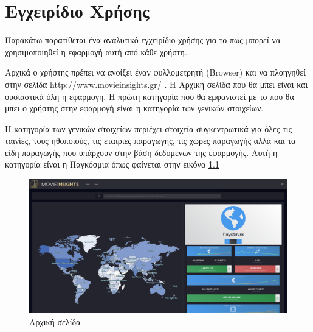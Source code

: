 \chapter{Εγχειρίδιο Χρήσης}
Παρακάτω παρατίθεται ένα αναλυτικό εγχειρίδιο χρήσης για το πως μπορεί να χρησιμοποιηθεί η εφαρμογή αυτή από κάθε χρήστη.

Αρχικά ο χρήστης πρέπει να ανοίξει έναν φυλλομετρητή (Browser) και να πλοηγηθεί στην σελίδα http://www.movieinsights.gr/ . Η Αρχική σελίδα που θα μπει είναι και ουσιαστικά όλη η εφαρμογή. Η πρώτη κατηγορία που θα εμφανιστεί με το που θα μπει ο χρήστης στην εφαρμογή είναι η κατηγορία των γενικών στοιχείων.

Η κατηγορία των γενικών στοιχείων περιέχει στοιχεία συγκεντρωτικά για όλες τις ταινίες, τους ηθοποιούς, τις εταιρίες παραγωγής, τις χώρες παραγωγής αλλά και τα είδη παραγωγής που υπάρχουν στην βάση δεδομένων της εφαρμογής. Αυτή η κατηγορία είναι η Παγκόσμια όπως φαίνεται στην εικόνα \ref{demo:main}

\begin{figure}[H]
  \centering
  \includegraphics[width=145mm]{Chapters/6 - Manual/Images/main_page.png}
  \caption{Αρχική σελίδα}
  \label{demo:main}
\end{figure}






